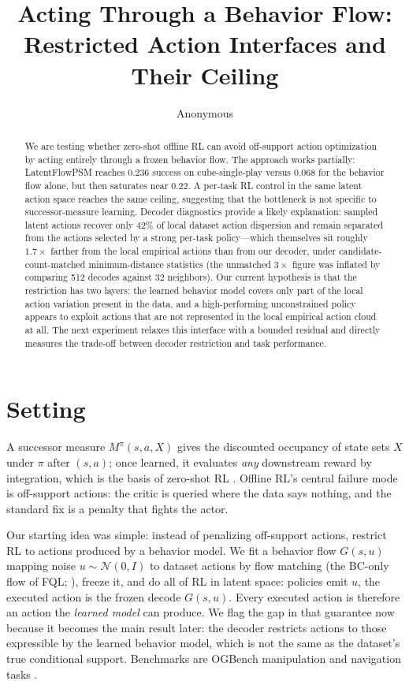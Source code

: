 \documentclass{article}
\title{Acting Through a Behavior Flow: Restricted Action Interfaces and Their Ceiling}
\author{Anonymous}
\begin{document}
\maketitle

\begin{abstract}
We are testing whether zero-shot offline RL can avoid off-support action optimization by acting entirely through a frozen behavior flow. The approach works partially: LatentFlowPSM reaches $0.236$ success on cube-single-play versus $0.068$ for the behavior flow alone, but then saturates near $0.22$. A per-task RL control in the same latent action space reaches the same ceiling, suggesting that the bottleneck is not specific to successor-measure learning. Decoder diagnostics provide a likely explanation: sampled latent actions recover only $42\%$ of local dataset action dispersion and remain separated from the actions selected by a strong per-task policy---which themselves sit roughly $1.7\times$ farther from the local empirical actions than from our decoder, under candidate-count-matched minimum-distance statistics (the unmatched $3\times$ figure was inflated by comparing 512 decodes against 32 neighbors). Our current hypothesis is that the restriction has two layers: the learned behavior model covers only part of the local action variation present in the data, and a high-performing unconstrained policy appears to exploit actions that are not represented in the local empirical action cloud at all. The next experiment relaxes this interface with a bounded residual and directly measures the trade-off between decoder restriction and task performance.
\end{abstract}

\section{Setting}
A successor measure $M^\pi(s,a,X)$ gives the discounted occupancy of state sets $X$ under $\pi$ after $(s,a)$; once learned, it evaluates \emph{any} downstream reward by integration, which is the basis of zero-shot RL \citep{touati2021learning}. Offline RL's central failure mode is off-support actions: the critic is queried where the data says nothing, and the standard fix is a penalty that fights the actor.

Our starting idea was simple: instead of penalizing off-support actions, restrict RL to actions produced by a behavior model. We fit a behavior flow $G(s,u)$ mapping noise $u\sim\mathcal{N}(0,I)$ to dataset actions by flow matching (the BC-only flow of FQL; \citealp{park2025fql}), freeze it, and do all of RL in latent space: policies emit $u$, the executed action is the frozen decode $G(s,u)$. Every executed action is therefore an action the \emph{learned model} can produce. We flag the gap in that guarantee now because it becomes the main result later: the decoder restricts actions to those expressible by the learned behavior model, which is not the same as the dataset's true conditional support. Benchmarks are OGBench manipulation and navigation tasks \citep{park2024ogbench}.
\end{document}
